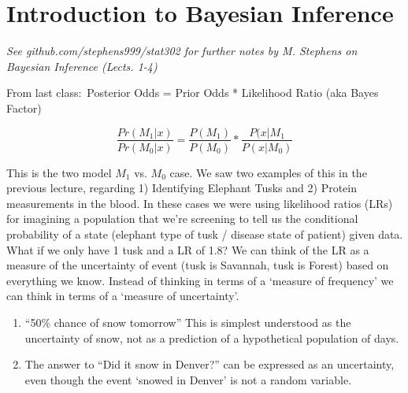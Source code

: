 \documentclass[12pt]{report}
\begin{document}

\maketitle

\vspace*{.1in}






\section{Introduction to Bayesian Inference}

\emph{See github.com/stephens999/stat302 for further notes by M. Stephens on Bayesian Inference (Lects. 1-4)}

From last class:\
Posterior Odds = Prior Odds * Likelihood Ratio (aka Bayes Factor)

\[
\frac{Pr(M_1|x)}{Pr(M_0|x)} = \frac{P(M_1)}{P(M_0)} * \frac{P(x|M_1}{P(x|M_0)}
\]

This is the two model $M_1$ vs. $M_0$ case. We saw two examples of this in the previous lecture, regarding 1) Identifying Elephant Tusks and 2) Protein measurements in the blood. In these cases we were using likelihood ratios (LRs) for imagining a population that we're screening to tell us the conditional probability of a state (elephant type of tusk / disease state of patient) given data.\\

What if we only have 1 tusk and a LR of 1.8? We can think of the LR as a measure of the uncertainty of event (tusk is Savannah, tusk is Forest) based on everything we know. Instead of thinking in terms of a `measure of frequency' we can think in terms of a `measure of uncertainty'.\\

\begin{enumerate}
\item ``50\% chance of snow tomorrow'' This is simplest understood as the uncertainty of snow, not as a prediction of a hypothetical population of days.
\item The answer to ``Did it snow in Denver?'' can be expressed as an uncertainty, even though the event `snowed in Denver' is not a random variable.
\end{enumerate}
\end{document}
